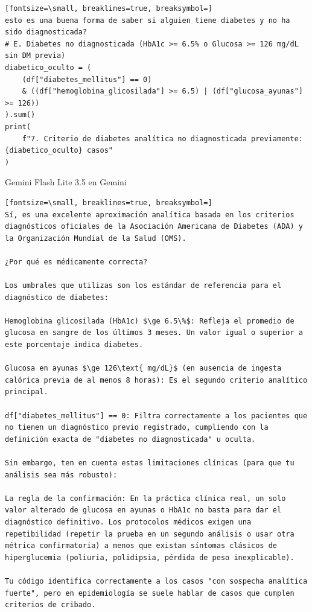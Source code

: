 \documentclass[12pt,a4paper,oneside]{book}
\begin{document}
\begin{iaprompt}
\begin{Verbatim}[fontsize=\small, breaklines=true, breaksymbol=]
esto es una buena forma de saber si alguien tiene diabetes y no ha sido diagnosticada?
# E. Diabetes no diagnosticada (HbA1c >= 6.5% o Glucosa >= 126 mg/dL sin DM previa)
diabetico_oculto = (
    (df["diabetes_mellitus"] == 0)
    & ((df["hemoglobina_glicosilada"] >= 6.5) | (df["glucosa_ayunas"] >= 126))
).sum()
print(
    f"7. Criterio de diabetes analítica no diagnosticada previamente: {diabetico_oculto} casos"
)
\end{Verbatim}
\end{iaprompt}
\begin{iaresp}{Gemini Flash Lite 3.5 en Gemini}
\begin{Verbatim}[fontsize=\small, breaklines=true, breaksymbol=]
Sí, es una excelente aproximación analítica basada en los criterios diagnósticos oficiales de la Asociación Americana de Diabetes (ADA) y la Organización Mundial de la Salud (OMS).

¿Por qué es médicamente correcta?

Los umbrales que utilizas son los estándar de referencia para el diagnóstico de diabetes:

Hemoglobina glicosilada (HbA1c) $\ge 6.5\%$: Refleja el promedio de glucosa en sangre de los últimos 3 meses. Un valor igual o superior a este porcentaje indica diabetes.

Glucosa en ayunas $\ge 126\text{ mg/dL}$ (en ausencia de ingesta calórica previa de al menos 8 horas): Es el segundo criterio analítico principal. 

df["diabetes_mellitus"] == 0: Filtra correctamente a los pacientes que no tienen un diagnóstico previo registrado, cumpliendo con la definición exacta de "diabetes no diagnosticada" u oculta.

Sin embargo, ten en cuenta estas limitaciones clínicas (para que tu análisis sea más robusto):

La regla de la confirmación: En la práctica clínica real, un solo valor alterado de glucosa en ayunas o HbA1c no basta para dar el diagnóstico definitivo. Los protocolos médicos exigen una repetibilidad (repetir la prueba en un segundo análisis o usar otra métrica confirmatoria) a menos que existan síntomas clásicos de hiperglucemia (poliuria, polidipsia, pérdida de peso inexplicable).

Tu código identifica correctamente a los casos "con sospecha analítica fuerte", pero en epidemiología se suele hablar de casos que cumplen criterios de cribado.


\end{Verbatim}
\end{iaresp}
\end{document}
